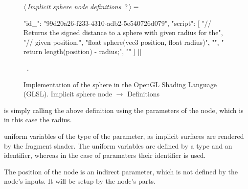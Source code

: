 \documentclass[%
    a4paper,    %
    justified,  %
    nobib,      %
    openany     %
]{tufte-book}
\begin{document}
\begin{figure}
\begin{flushleft} \small
\begin{minipage}{\linewidth}\label{scrap102}\raggedright\small
{} $\langle\,${\itshape Implicit sphere node definitions}\nobreak\ {\footnotesize {?}}$\,\rangle\equiv$
\vspace{-1ex}
\begin{pythoncode}
{
    "id_": "99d20a26-f233-4310-adb2-5e540726d079",
    "script": [
        "// Returns the signed distance to a sphere with given radius for the",
        "// given position.",
        "float sphere(vec3 position, float radius)",
        "{",
        "    return length(position) - radius;",
        "}"
    ]
}|\NWsep|
\end{pythoncode}
\vspace{1.5ex}
\footnotesize
\begin{list}{}{\setlength{\itemsep}{-\parsep}\setlength{\itemindent}{-\leftmargin}}
\item \NWtxtMacroRefIn\ .

\item{}
\end{list}
\end{minipage}\vspace{4ex}
\end{flushleft}
\caption{Implementation of the sphere in the OpenGL Shading Language (GLSL).
  \newline{}\newline{}Implicit sphere node $\rightarrow$ Definitions}
\label{editor:lst:nodes:sphere-node:definition}
\end{figure}

 is simply calling the above definition
using the parameters of the node, which is in this case the radius.

 uniform variables
of the type of the parameter, as implicit surfaces are rendered by the fragment
shader. The uniform variables are defined by a type and an identifier, whereas
in the case of paramaters their identifier is used.

The position of the node is an indirect parameter, which is not defined by the
node's inputs. It will be setup by the node's parts.
\end{document}
